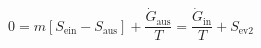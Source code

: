 

\item[c)] \[ 0 = m \left[ S_{\text{ein}} - S_{\text{aus}} \right] + \frac{\dot{G}_{\text{aus}}}{T} = \frac{\dot{G}_{\text{in}}}{T} + S_{\text{ev2}} \]